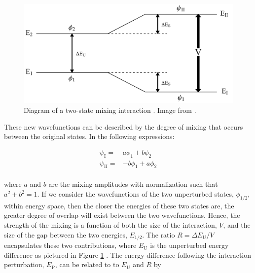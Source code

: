 \begin{figure}[!ht]
  \centering
  \includegraphics[width=\textwidth]{theory_mixing_diagram.png}
  \caption[Diagram of a two-state mixing interaction \cite{KraneText}. Image from \cite{EvittsThesis}.]{Diagram of a two-state mixing interaction \cite{KraneText}. Image from \cite{EvittsThesis}.}
  \label{figure: diagram of two-state mixing model}
\end{figure}

These new wavefunctions can be described by the degree of mixing that occurs between the original states. In the following expressions:

\begin{equation}
\begin{aligned}
\psi_\mathrm{I} = & a\phi_1 + b\phi_2 \\
\psi_\mathrm{II} = & -b\phi_1 + a\phi_2 \\
\label{equation: wavefunctions of mixed states}
\end{aligned}
\end{equation}

where $a$ and $b$ are the mixing amplitudes with normalization such that $a^2 + b^2 = 1$. If we consider the wavefunctions of the two unperturbed states, $\phi_{1/2}$, within energy space, then the closer the energies of these two states are, the greater degree of overlap will exist between the two wavefunctions. Hence, the strength of the mixing is a function of both the size of the interaction, $V$, and the size of the gap between the two energies, $E_{1/2}$. The ratio $R = \Delta E_\mathrm{U}/V$ encapsulates these two contributions, where $E_\mathrm{U}$ is the unperturbed energy difference as pictured in Figure \ref{figure: diagram of two-state mixing model} \cite{CastenText}. The energy difference following the interaction perturbation, $E_\mathrm{P}$, can be related to to $E_\mathrm{U}$ and $R$ by

